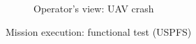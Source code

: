 \begin{figure}[!hbt]
\begin{subfigure}[t]{0.49\textwidth}
    \caption{Operator's view: UAV crash}%
    \label{fig:mission-exec-uspfs-final}
  \end{subfigure}
%  
  \caption{Mission execution: functional test (USPFS)}
  \label{fig:mission-exec-uspfs}
\end{figure}

